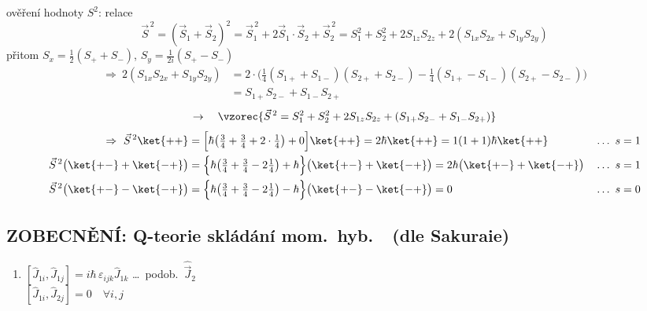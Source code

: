 \begin{priklad}
ověření hodnoty $S^2$: relace
\[
  \vec S^{\,2} = (\vec S_1 + \vec S_2)^2 = \vec S_1^{\,2} + 2\vec S_1\cdot\vec S_2 + \vec S_2^{\,2}
  = S_1^2 + S_2^2 + 2S_{1z}S_{2z} + 2(S_{1x}S_{2x} + S_{1y}S_{2y})
\]
přitom \quad $S_x = \frac12(S_+ + S_-)$, \qquad $S_y = \frac{1}{2i}(S_+ - S_-)$
\begin{align*}
  \Rightarrow\ 2(S_{1x}S_{2x} + S_{1y}S_{2y})
  &= 2\cdot\Big(\tfrac14(S_{1+} + S_{1-})(S_{2+} + S_{2-}) - \tfrac14(S_{1+} - S_{1-})(S_{2+} - S_{2-})\Big) \\
  &= S_{1+}S_{2-} + S_{1-}S_{2+}
\end{align*}
\[
  \to\quad \vzorec{\vec S^{\,2} = S_1^2 + S_2^2 + 2S_{1z}S_{2z} + (S_{1+}S_{2-} + S_{1-}S_{2+})}
\]
\begin{align*}
  \Rightarrow\ \vec S^{\,2}\ket{++} &= \Big[\hbar\big(\tfrac34 + \tfrac34 + 2\cdot\tfrac14\big) + 0\Big]\ket{++} = 2\hbar\ket{++} = 1(1+1)\hbar\ket{++} &&\dots\ s = 1 \\
  \vec S^{\,2}\big(\ket{+-} + \ket{-+}\big) &= \Big\{\hbar\big(\tfrac34 + \tfrac34 - 2\tfrac14\big) + \hbar\Big\}\big(\ket{+-} + \ket{-+}\big) = 2\hbar\big(\ket{+-} + \ket{-+}\big) &&\dots\ s = 1 \\
  \vec S^{\,2}\big(\ket{+-} - \ket{-+}\big) &= \Big\{\hbar\big(\tfrac34 + \tfrac34 - 2\tfrac14\big) - \hbar\Big\}\big(\ket{+-} - \ket{-+}\big) = 0 &&\dots\ s = 0
\end{align*}
\end{priklad}

\subsection*{ZOBECNĚNÍ: Q-teorie skládání mom.\ hyb.\ \ {\normalfont\color{defbarva}(dle Sakuraie)}}

\begin{enumerate}[label=\textcircled{\arabic*}]
  \item $[\hat J_{1i},\hat J_{1j}] = i\hbar\,\varepsilon_{ijk}\hat J_{1k}$ \quad \dots\ podob.\ $\hat{\vec J}_2$ \\
        $[\hat J_{1i},\hat J_{2j}] = 0 \quad \forall i,j$
\end{enumerate}

